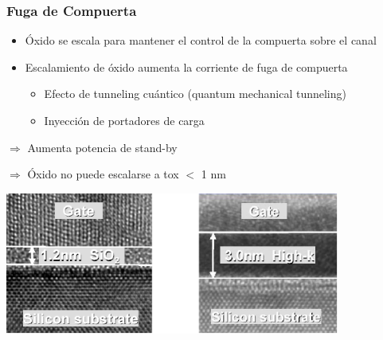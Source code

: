 \documentclass[t,aspectratio=169,10pt]{beamer}
\begin{document}
\begin{frame}
\frametitle{Fuga de Compuerta}
\begin{itemize}
	\item Óxido se escala para mantener el control de la compuerta sobre el canal
	\item Escalamiento de óxido aumenta la corriente de fuga de compuerta
	\begin{itemize}
		\item Efecto de tunneling cuántico (quantum mechanical tunneling)
		\item Inyección de portadores de carga
	\end{itemize}
\end{itemize}

$\Rightarrow$ Aumenta potencia de stand-by

$\Rightarrow$ Óxido no puede escalarse a tox $<$ 1 nm

\centering
\includegraphics[width=11cm]{fuga-compuerta}
\end{frame}
\end{document}
